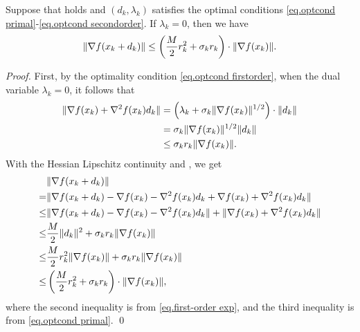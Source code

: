 \begin{lemma}\label{lem.gradient norm conceptual}
    Suppose that  holds and $(d_k, \lambda_k)$ satisfies the optimal conditions \eqref{eq.optcond primal}-\eqref{eq.optcond secondorder}. If $\lambda_k = 0$, then we have
    \begin{equation}
        \label{eq.bound gkn}
        \|\nabla f(x_k+d_k)\| \le \left(\frac{M}{2} r_k^2 + \sigma_k r_k\right) \cdot \|\nabla f(x_k)\|.
    \end{equation}
\end{lemma}
\begin{proof}
    First, by the optimality condition \eqref{eq.optcond firstorder}, when the dual variable $\lambda_k = 0$, it follows that
    \begin{align*}
        \|\nabla f(x_k) + \nabla ^2 f(x_k) d_k\| & = \left(\lambda_k + \sigma_k \|\nabla f(x_k)\|^{1/2}\right) \cdot \|d_k\| \\
                          & = \sigma_k \|\nabla f(x_k)\|^{1/2}\|d_k\|                                 \\
                          & \leq \sigma_k r_k \|\nabla f(x_k)\|.
    \end{align*}
    With the Hessian Lipschitz continuity and , we get
        \begin{align}
        \notag
            &\|\nabla f(x_k+d_k)\|\\
             =& \|\nabla f(x_k+d_k) - \nabla f(x_k) - \nabla^2 f(x_k) d_k + \nabla f(x_k) + \nabla^2 f(x_k) d_k\| \notag        \\
                                   \leq& \|\nabla f(x_k+d_k) - \nabla f(x_k) - \nabla^2 f(x_k) d_k\| + \|\nabla f(x_k) + \nabla^2 f(x_k) d_k\| \notag \\
                                   \leq& \frac{M}{2}\|d_k\|^2 + \sigma_k r_k \|\nabla f(x_k)\| \notag               \\
                                   \leq& \frac{M}{2} r_k^2 \|\nabla f(x_k)\| + \sigma_k r_k \|\nabla f(x_k)\| \notag          \\
                                   \leq& \left(\frac{M}{2} r_k^2 + \sigma_k r_k\right) \cdot \|\nabla f(x_k)\|,
        \end{align}
    where the second inequality is from \eqref{eq.first-order exp}, and the third inequality is from \eqref{eq.optcond primal}.
\smartqed \qed \end{proof}

